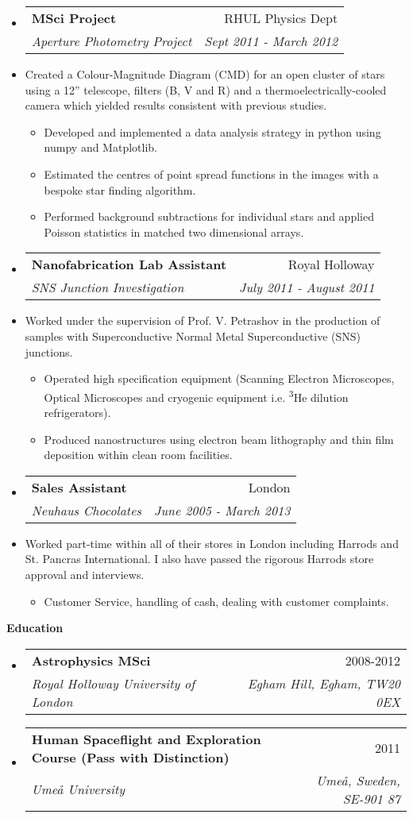 \documentclass[letterpaper,11pt]{article}
\makeatletter
\newcommand{\resitem}[1]{\item #1 \vspace{-2pt}}
\newcommand{\resheading}[1]{{\large \colorbox{mygrey}
                            {\begin{minipage}{\textwidth}
                            {\textbf{#1 \vphantom{p\^{E}}}}
                            \end{minipage}}}
}
\newcommand{\ressubheading}[4]{
                \begin{tabular*}{180mm}{l@{\extracolsep{\fill}}r}
                \textbf{#1} & #2 \\
                \textit{#3} & \textit{#4} \\
                \end{tabular*}\vspace{-6pt}
}
\newcommand{\resdescription}[1]{#1 \vspace{-0mm}}
\makeatother
\begin{document}
\begin{itemize}
  \item[]
  \ressubheading{MSci Project}{RHUL Physics Dept}{Aperture Photometry Project}{Sept 2011 - March 2012}
  \item[]
    \resdescription{Created a Colour-Magnitude Diagram (CMD) for an open cluster of stars using a 12'' telescope, filters (B, V and R) and a thermoelectrically-cooled camera which yielded results consistent with previous studies.}
    \begin{itemize}
      \resitem{Developed and implemented a data analysis strategy in python using numpy and Matplotlib.}
      \resitem{Estimated the centres of point spread functions in the images with a bespoke star finding algorithm.}
      \resitem{Performed background subtractions for individual stars and applied Poisson statistics in matched two dimensional arrays.}
    \end{itemize}

  \item[]
  \ressubheading{Nanofabrication Lab Assistant}{Royal Holloway}{SNS Junction Investigation}{July 2011 - August 2011}
  \item[]
     \resdescription{Worked under the supervision of Prof. V. Petrashov in the production of samples with Superconductive Normal Metal Superconductive (SNS) junctions.}
     \begin{itemize}
       \resitem{Operated high specification equipment (Scanning Electron Microscopes, Optical Microscopes and cryogenic equipment i.e. \textsuperscript{3}He dilution refrigerators).}
       \resitem{Produced nanostructures using electron beam lithography and thin film deposition within clean room facilities.}
     \end{itemize}

  \item[]
  \ressubheading{Sales Assistant}{London}{Neuhaus Chocolates}{June 2005 - March 2013}
  \item[]
    \resdescription{Worked part-time within all of their stores in London including Harrods and St. Pancras International. I also have passed the rigorous Harrods store approval and interviews.}
    \begin{itemize}
      \resitem{Customer Service, handling of cash, dealing with customer complaints.}
    \end{itemize}

\end{itemize}

\resheading{Education}
\begin{itemize}
  \item[]
      \ressubheading{Astrophysics MSci }{2008-2012}{Royal Holloway University of London}{Egham Hill, Egham, TW20 0EX}

  \item[]
    \ressubheading{Human Spaceflight and Exploration Course (Pass with Distinction)}{2011}{Ume\r{a} University}{Ume\r{a}, Sweden, SE-901 87}

\end{itemize}
\end{document}
